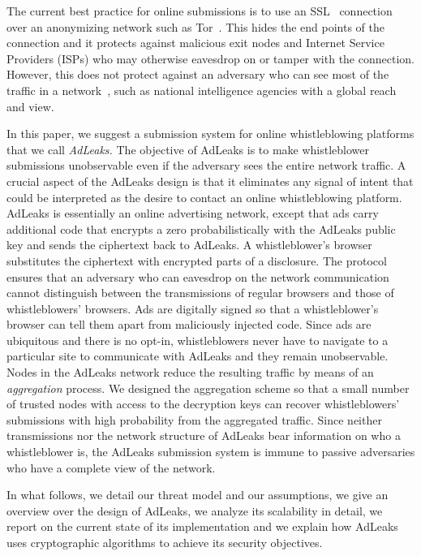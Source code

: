 \documentclass[twocolumn,10pt]{article}
\begin{document}
The current best practice for online submissions is to use an
SSL~\cite{rfc6101} connection over an anonymizing network such as
Tor~\cite{DingledineMS2004}.  This hides the end points of the connection
and it protects against malicious exit nodes and Internet Service Providers
(ISPs) who may otherwise eavesdrop on or tamper with the connection.
However, this does not protect against an adversary who can see most of the
traffic in a network~\cite{ChakravartySK2010,DyerCRS2012}, such as national
intelligence agencies with a global reach and view.

In this paper, we suggest a submission system for online whistleblowing
platforms that we call \emph{AdLeaks.}  The objective of AdLeaks is to make
whistleblower submissions unobservable even if the adversary sees the entire
network traffic.  A crucial aspect of the AdLeaks design is that it
eliminates any signal of intent that could be interpreted as the desire to
contact an online whistleblowing platform.
AdLeaks is essentially an online advertising network, except that ads carry
additional code that encrypts a zero probabilistically with the AdLeaks
public key and sends the ciphertext back to AdLeaks.  A whistleblower's
browser substitutes the ciphertext with encrypted parts of a disclosure.
The protocol ensures that an adversary who can eavesdrop on the network
communication cannot distinguish between the transmissions of regular
browsers and those of whistleblowers' browsers.  Ads are digitally signed so
that a whistleblower's browser can tell them apart from maliciously injected
code.  Since ads are ubiquitous and there is no opt-in, whistleblowers never
have to navigate to a particular site to communicate with AdLeaks and they
remain unobservable.  Nodes in the AdLeaks network reduce the resulting
traffic by means of an \emph{aggregation} process.  We designed the
aggregation scheme so that a small number of trusted nodes with access to
the decryption keys can recover whistleblowers' submissions with high
probability from the aggregated traffic.  Since neither transmissions nor
the network structure of AdLeaks bear information on who a whistleblower is,
the AdLeaks submission system is immune to passive adversaries who have a
complete view of the network.

In what follows, we detail our threat model and our assumptions, we give an
overview over the design of AdLeaks, we analyze its scalability in detail,
we report on the current state of its implementation and we explain how
AdLeaks uses cryptographic algorithms to achieve its security objectives.
\end{document}
